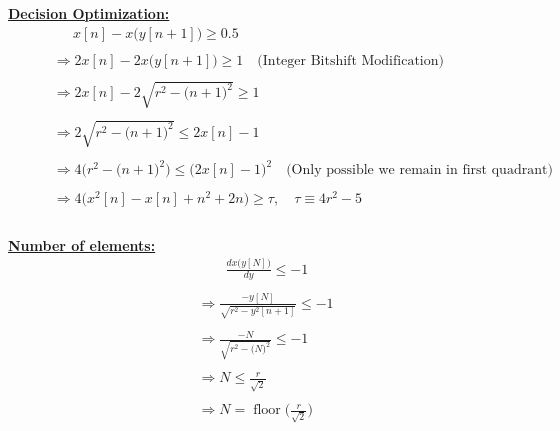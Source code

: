 \documentclass{article}
\DeclareMathOperator{\floor}{floor}
\begin{document}
\underline{\textbf{Decision Optimization:}}
\begin{align*}
    &\quad \quad \quad \ \ x[n] - x\Big(y[n + 1]\Big) \geq 0.5 \\ \\
    &\quad \quad \Rightarrow 2x[n] - 2x\Big(y[n + 1]\Big) \geq 1 \quad \big(\text{Integer Bitshift Modification}\big) \\ \\
    &\quad \quad \Rightarrow 2x[n] - 2\sqrt{r^{2} - \big(n + 1\big)^{2}} \geq 1 \\ \\
    &\quad \quad \Rightarrow 2\sqrt{r^{2} - \big(n + 1\big)^{2}} \leq 2x[n] - 1 \\ \\
    &\quad \quad \Rightarrow 4\Big(r^{2} - \big(n + 1\big)^{2}\Big) \leq \Big(2x[n] - 1\Big)^{2} \quad \big(\text{Only possible we remain in first quadrant}\big) \\ \\
    &\quad \quad \Rightarrow 4\Big(x^{2}[n] - x[n] + n^{2} + 2n\Big) \geq \tau, \quad \tau \equiv 4r^{2} - 5 \\ \\
\end{align*}

\underline{\textbf{Number of elements:}}
\begin{align*}
    &\quad \quad \frac{dx\Big(y[N]\Big)}{dy} \leq -1 \\ \\
    &\Rightarrow \frac{-y[N]}{\sqrt{r^{2} - y^{2}[n + 1]}} \leq -1 \\ \\
    &\Rightarrow \frac{-N}{\sqrt{r^{2} - \big(N\big)^{2}}} \leq -1 \\ \\
    &\Rightarrow N \leq \frac{r}{\sqrt{2}} \\ \\
    &\Rightarrow N = \floor\Bigg(\frac{r}{\sqrt{2}}\Bigg) \\ \\
\end{align*}
\end{document}
